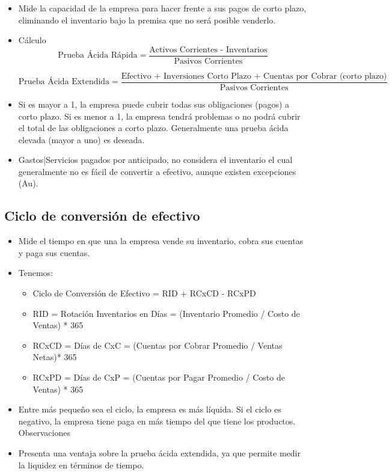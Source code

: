 \begin{itemize}
    \item Mide  la  capacidad  de  la  empresa  para  hacer  frente  a  sus  pagos  de  corto  plazo,  eliminando  el 
    inventario bajo la premisa que no será posible venderlo. 
    \item Cálculo 
    {\small$$\text{Prueba Ácida Rápida} = \frac{\text{Activos Corrientes - Inventarios}}{\text{Pasivos Corrientes}} $$}

    {\small$$\text{Prueba Ácida Extendida} =  \frac{\text{Efectivo + Inversiones Corto Plazo + Cuentas por Cobrar (corto plazo)}}{\text{Pasivos Corrientes}} $$}
                                                        
    \item Si es mayor a 1, la empresa puede cubrir todas sus obligaciones (pagos) a corto plazo. Si es menor a 
    1,  la  empresa  tendrá  problemas  o  no  podrá  cubrir  el  total  de  las  obligaciones  a  corto  plazo. 
    Generalmente una prueba ácida elevada (mayor a uno) es deseada. 
    \item Gastos|Servicios pagados por anticipado, no considera el inventario el cual generalmente no es fácil 
    de convertir a efectivo, aunque existen excepciones (Au).
\end{itemize}




\subsection{Ciclo de conversión de efectivo}

\begin{itemize}
    
\item Mide el tiempo en que una la empresa vende su inventario, cobra sus cuentas y paga sus cuentas. 
 
\item Tenemos: 
\begin{itemize}
\item 
     Ciclo de Conversión de Efectivo =  RID + RCxCD - RCxPD 
\item 
     RID = Rotación Inventarios en Días = (Inventario Promedio / Costo de Ventas) * 365 
\item 
     RCxCD = Días de CxC = (Cuentas por Cobrar Promedio / Ventas Netas)* 365 
\item 
     RCxPD = Días de CxP = (Cuentas por Pagar Promedio / Costo de Ventas) * 365

\end{itemize}
 
\item Entre más pequeño sea el ciclo, la empresa es más líquida. Si el ciclo es negativo, la empresa tiene 
paga en más tiempo del que tiene los productos. 
Observaciones 
\item Presenta una ventaja sobre la prueba ácida extendida, ya que permite medir la liquidez en términos de 
tiempo.
\end{itemize}


